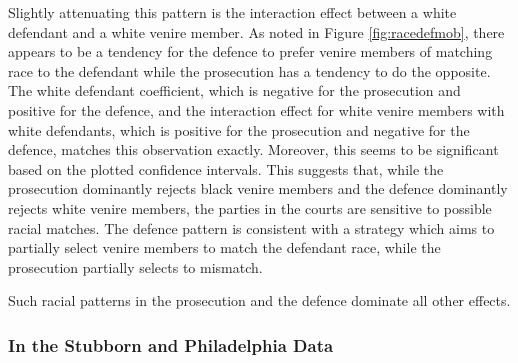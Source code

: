 \documentclass[12pt]{article}
\begin{document}
Slightly attenuating this pattern is the interaction effect between a white defendant and a white venire member. As noted in Figure \ref{fig:racedefmob}, there appears to be a tendency for the defence to prefer venire members of matching race to the defendant while the prosecution has a tendency to do the opposite. The white defendant coefficient, which is negative for the prosecution and positive for the defence, and the interaction effect for white venire members with white defendants, which is positive for the prosecution and negative for the defence, matches this observation exactly. Moreover, this seems to be significant based on the plotted confidence intervals. This suggests that, while the prosecution dominantly rejects black venire members and the defence dominantly rejects white venire members, the parties in the courts are sensitive to possible racial matches. The defence pattern is consistent with a strategy which aims to partially select venire members to match the defendant race, while the prosecution partially selects to mismatch.

Such racial patterns in the prosecution and the defence dominate all other effects.

\subsubsection{In the Stubborn and Philadelphia Data}
\end{document}
